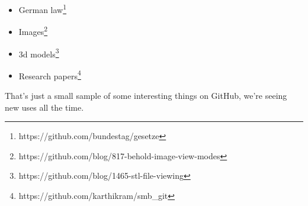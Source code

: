 \begin{itemize}
\item German law\footnote{https://github.com/bundestag/gesetze}
\item Images\footnote{https://github.com/blog/817-behold-image-view-modes}
\item 3d models\footnote{https://github.com/blog/1465-stl-file-viewing}
\item Research papers\footnote{https://github.com/karthikram/smb\_git}
\end{itemize}

That's just a small sample of some interesting things on GitHub, we're seeing new uses all the time.